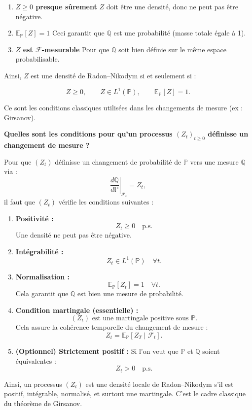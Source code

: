 \documentclass[11pt,a4paper]{article}
\newenvironment{QA}[1]{
    \begin{questionbox}
        \textbf{#1}
    \end{questionbox}
    \begin{answerbox}
}{
    \end{answerbox}
}
\begin{document}
\begin{enumerate}
    \item \textbf{$Z \ge 0$ presque sûrement}  
    $Z$ doit être une densité, donc ne peut pas être négative.

    \item \textbf{$\mathbb{E}_{\mathbb{P}}[Z] = 1$}  
    Ceci garantit que $\mathbb{Q}$ est une probabilité (masse totale égale à 1).

    \item \textbf{$Z$ est $\mathcal{F}$-mesurable}  
    Pour que $\mathbb{Q}$ soit bien définie sur le même espace probabilisable.

\end{enumerate}

Ainsi, $Z$ est une densité de Radon–Nikodym si et seulement si :

\[
Z \ge 0, \qquad Z \in L^1(\mathbb{P}), \qquad \mathbb{E}_{\mathbb{P}}[Z] = 1.
\]

Ce sont les conditions classiques utilisées dans les changements de mesure (ex : Girsanov).
\newpage

\begin{QA}{Quelles sont les conditions pour qu'un processus $(Z_t)_{t\ge 0}$ définisse un changement de mesure ?}
Pour que $(Z_t)$ définisse un changement de probabilité de $\mathbb{P}$ vers une mesure
$\mathbb{Q}$ via :
\[
\left.\frac{d\mathbb{Q}}{d\mathbb{P}}\right|_{\mathcal{F}_t} = Z_t,
\]
il faut que $(Z_t)$ vérifie les conditions suivantes :

\begin{enumerate}
    \item \textbf{Positivité :}  
    \[
    Z_t \ge 0 \quad \text{p.s.}
    \]
    Une densité ne peut pas être négative.

    \item \textbf{Intégrabilité :}  
    \[
    Z_t \in L^1(\mathbb{P}) \quad \forall t.
    \]

    \item \textbf{Normalisation :}  
    \[
    \mathbb{E}_{\mathbb{P}}[Z_t] = 1 \quad \forall t.
    \]
    Cela garantit que $\mathbb{Q}$ est bien une mesure de probabilité.

    \item \textbf{Condition martingale (essentielle) :}  
    \[
    (Z_t) \text{ est une martingale positive sous } \mathbb{P}.
    \]
    Cela assure la cohérence temporelle du changement de mesure :
    \[
    Z_t = \mathbb{E}_{\mathbb{P}}[Z_T \mid \mathcal{F}_t].
    \]

    \item \textbf{(Optionnel) Strictement positif :}  
    Si l’on veut que $\mathbb{P}$ et $\mathbb{Q}$ soient équivalentes :
    \[
    Z_t > 0 \quad \text{p.s.}
    \]
\end{enumerate}

Ainsi, un processus $(Z_t)$ est une densité locale de Radon–Nikodym s'il est positif,
intégrable, normalisé, et surtout une martingale. C'est le cadre classique du théorème
de Girsanov.
\end{QA}
\end{document}

